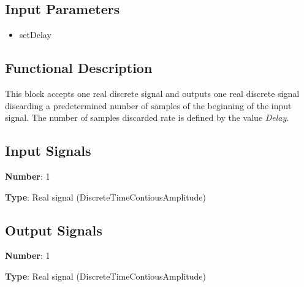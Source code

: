 \documentclass[../../sdf/tex/BPSK_system.tex]{subfiles}
\begin{document}
\onlyinsubfile{\maketitle}

\subsection*{Input Parameters}

\begin{multicols}{2}
	\begin{itemize}
		\item setDelay
	\end{itemize}
\end{multicols}

\subsection*{Functional Description}

This block accepts one real discrete signal and outputs one real discrete signal discarding a predetermined number of samples of the beginning of the input signal. The number of samples discarded rate is defined by the value \textit{Delay}.

\subsection*{Input Signals}

\textbf{Number}: 1

\textbf{Type}: Real signal (DiscreteTimeContiousAmplitude)

\subsection*{Output Signals}

\textbf{Number}: 1

\textbf{Type}: Real signal (DiscreteTimeContiousAmplitude)
\end{document}
